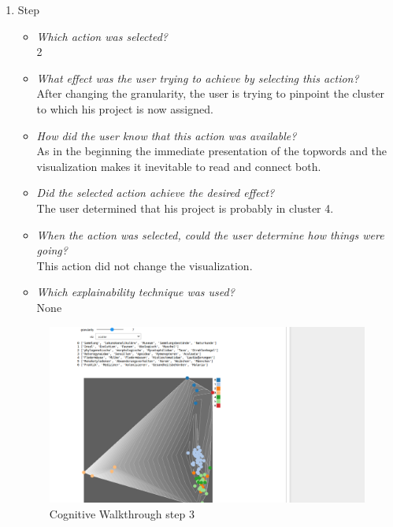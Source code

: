 {\begin{enumerate}
		\item Step
		\begin{itemize}
			\item \textit{Which action was selected?} \\
			2
			\item \textit{What effect was the user trying to achieve by selecting this action?} \\
			After changing the granularity, the user is trying to pinpoint the cluster to which his project is now assigned. 
			\item \textit{How did the user know that this action was available?} \\
			As in the beginning the immediate presentation of the topwords and the visualization makes it inevitable to read and connect both. 
			\item \textit{Did the selected action achieve the desired effect?} \\
			The user determined that his project is probably in cluster 4. 
			\item \textit{When the action was selected, could the user determine how things were going?} \\
			This action did not change the visualization.
			\item \textit{Which explainability technique was used?}\\
			None
		\end{itemize}
		\begin{figure}[H]
			\centering
			\includegraphics[width=400px]{../chapters/validation/pics/2_c}
			\caption{\label{pic:step3} Cognitive Walkthrough step 3}
		\end{figure} \newpage
		

\end{enumerate}}

